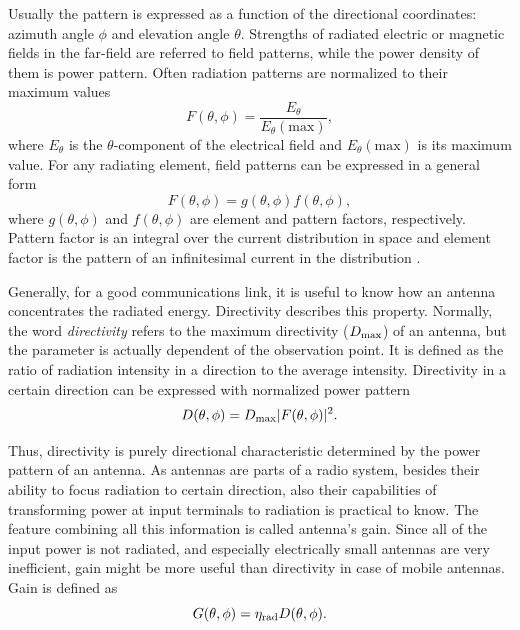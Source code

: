 Usually the pattern is expressed as a function of the directional coordinates: azimuth angle $\phi$ and elevation angle $\theta$. Strengths of radiated electric or magnetic fields in the far-field are referred to field patterns, while the power density of them is power pattern. Often radiation patterns \cite{stutzman} are normalized to their maximum values
\begin{equation}
\label{eq:f_norm}
    F(\theta,\phi)=\frac{E_\theta}{E_\theta(\mathrm{max})},
\end{equation}
where $E_\theta$ is the $\theta$-component of the electrical field and $E_\theta(\mathrm{max})$ is its maximum value. For any radiating element, field patterns \cite{stutzman} can be expressed in a general form
\begin{equation}
\label{eq:f_gen}
    F(\theta,\phi) = g(\theta,\phi)f(\theta,\phi),
\end{equation}
where $g(\theta,\phi)$ and $f(\theta,\phi)$ are element and pattern factors, respectively. Pattern factor is an integral over the current distribution in space and element factor is the pattern of an infinitesimal current in the distribution \cite{stutzman}.

Generally, for a good communications link, it is useful to know how an antenna concentrates the radiated energy. Directivity describes this property. Normally, the word \textit{directivity} refers to the maximum directivity (${D}_{\mathrm{max}}$) of an antenna, but the parameter is actually dependent of the observation point. It is defined as the ratio of radiation intensity in a direction to the average intensity. Directivity \cite{stutzman} in a certain direction can be expressed with normalized power pattern 
\begin{equation}
\label{eq:dir}
    D(\theta, \phi) = {D}_{\mathrm{max}}|F(\theta,\phi)|^2.
\end{equation}

Thus, directivity is purely directional characteristic determined by the power pattern of an antenna. As antennas are parts of a radio system, besides their ability to focus radiation to certain direction, also their capabilities of transforming power at input terminals to radiation is practical to know. The feature combining all this information is called antenna's gain. Since all of the input power is not radiated, and especially electrically small antennas are very inefficient, gain might be more useful than directivity in case of mobile antennas. Gain \cite{stutzman} is defined as 
\begin{equation}
    \label{eq:gain}
    G(\theta,\phi) = {\eta}_{\mathrm{rad}}D(\theta,\phi).
\end{equation}

